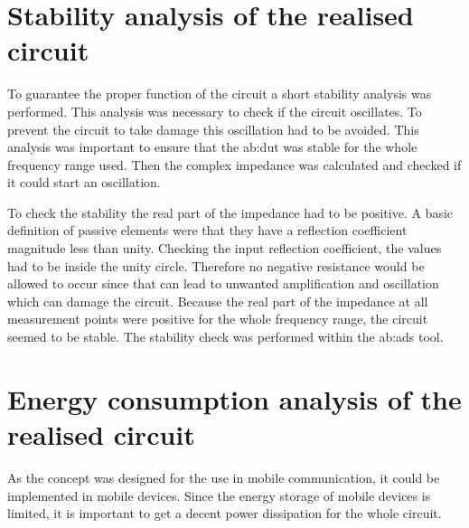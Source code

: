 
\section{Stability analysis of the realised circuit}
To guarantee the proper function of the circuit a short stability analysis was performed.
This analysis was necessary to check if the circuit oscillates.
To prevent the circuit to take damage this oscillation had to be avoided.
This analysis was important to ensure that the \gls{ab:dut} was stable for the whole frequency range used.
 Then the complex impedance was calculated and checked if it could start an oscillation.

To check the stability the real part of the impedance had to be positive.
A basic definition of passive elements were that they have a reflection coefficient magnitude less than unity.
Checking the input reflection coefficient, the values had to be inside the unity circle.
Therefore no negative resistance would be allowed to occur since that can lead to unwanted amplification and oscillation which can damage the circuit.
Because the real part of the impedance at all measurement points were positive for the whole frequency range, the circuit seemed to be stable.
The stability check was performed within the \gls{ab:ads} tool. 


\section{Energy consumption analysis of the realised circuit}
As the concept was designed for the use in mobile communication, it could be implemented in mobile devices.
Since the energy storage of mobile devices is limited, it is important to get a decent power dissipation for the whole circuit.

